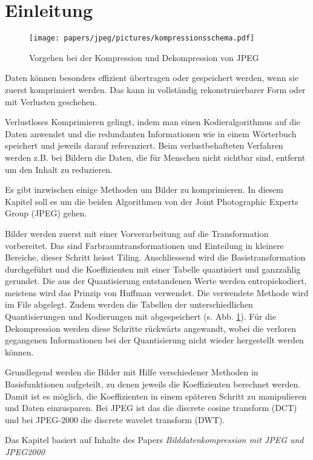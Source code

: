 %
%
%
%
\section{Einleitung\label{jpeg:section:einleitung}}
\begin{figure}
    \centering
    \texttt{[image: papers/jpeg/pictures/kompressionsschema.pdf]}
    \caption{Vorgehen bei der Kompression und Dekompression von JPEG
        \label{jpeg:fig:kompressionsschema}}
\end{figure}
Daten können besonders effizient übertragen oder gespeichert werden, wenn sie zuerst komprimiert werden.
Das kann in vollständig rekonstruierbarer Form oder mit Verlusten geschehen.

Verlustloses Komprimieren gelingt, indem man einen Kodieralgorithmus auf die Daten anwendet und die redundanten Informationen wie in einem Wörterbuch speichert und jeweils darauf referenziert. Beim verlustbehafteten Verfahren werden z.B. bei Bildern die Daten, die für Menschen nicht sichtbar sind, entfernt um den Inhalt zu reduzieren.

Es gibt inzwischen einige Methoden um Bilder zu komprimieren.
In diesem Kapitel soll es um die beiden Algorithmen von der Joint Photographic Experts Group (JPEG) gehen.


Bilder werden zuerst mit einer Vorverarbeitung auf die Transformation vorbereitet.
Das sind Farb\-raumtransformationen und Einteilung in kleinere Bereiche, dieser Schritt heisst Tiling.
Anschlies\-send wird die Basistransformation durchgeführt und die Koeffizienten mit einer Tabelle quantisiert und ganzzahlig gerundet.
Die aus der Quantisierung entstandenen Werte werden entropiekodiert, meistens wird das Prinzip von Huffman verwendet.
Die verwendete Methode wird im File abgelegt.
Zudem werden die Tabellen der unterschiedlichen Quantisierungen und Kodierungen mit abgespeichert (s. Abb. \ref{jpeg:fig:kompressionsschema}).
Für die Dekompression werden diese Schritte rückwärts angewandt, wobei die verloren gegangenen Informationen bei der Quantisierung nicht wieder hergestellt werden können. 

Grundlegend werden die Bilder mit Hilfe verschiedener Methoden in Basisfunktionen aufgeteilt, zu denen jeweils die Koeffizienten berechnet werden.
Damit ist es möglich, die Koeffizienten in einem späteren Schritt zu manipulieren und Daten einzusparen. 
Bei JPEG ist das die discrete cosine transform (DCT) und bei JPEG-2000 die discrete wavelet transform (DWT).

Das Kapitel basiert auf Inhalte des Papers \textit{Bilddatenkompression mit JPEG und JPEG2000} \cite{jpeg:laurahochstrat}